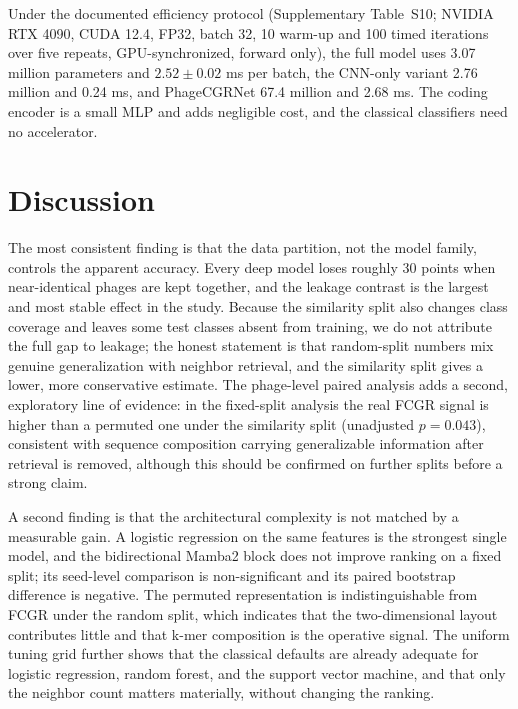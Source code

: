 \documentclass[utf8]{FrontiersinVancouver}
\begin{document}
Under the documented efficiency protocol (Supplementary Table~S10; NVIDIA RTX 4090, CUDA 12.4, FP32, batch 32, 10 warm-up and 100 timed iterations over five repeats, GPU-synchronized, forward only), the full model uses 3.07 million parameters and $2.52\pm0.02$ ms per batch, the CNN-only variant 2.76 million and 0.24 ms, and PhageCGRNet 67.4 million and 2.68 ms. The coding encoder is a small MLP and adds negligible cost, and the classical classifiers need no accelerator.

\section{Discussion}

The most consistent finding is that the data partition, not the model family, controls the apparent accuracy. Every deep model loses roughly 30 points when near-identical phages are kept together, and the leakage contrast is the largest and most stable effect in the study. Because the similarity split also changes class coverage and leaves some test classes absent from training, we do not attribute the full gap to leakage; the honest statement is that random-split numbers mix genuine generalization with neighbor retrieval, and the similarity split gives a lower, more conservative estimate. The phage-level paired analysis adds a second, exploratory line of evidence: in the fixed-split analysis the real FCGR signal is higher than a permuted one under the similarity split (unadjusted $p=0.043$), consistent with sequence composition carrying generalizable information after retrieval is removed, although this should be confirmed on further splits before a strong claim.

A second finding is that the architectural complexity is not matched by a measurable gain. A logistic regression on the same features is the strongest single model, and the bidirectional Mamba2 block does not improve ranking on a fixed split; its seed-level comparison is non-significant and its paired bootstrap difference is negative. The permuted representation is indistinguishable from FCGR under the random split, which indicates that the two-dimensional layout contributes little and that k-mer composition is the operative signal. The uniform tuning grid further shows that the classical defaults are already adequate for logistic regression, random forest, and the support vector machine, and that only the neighbor count matters materially, without changing the ranking.
\end{document}
